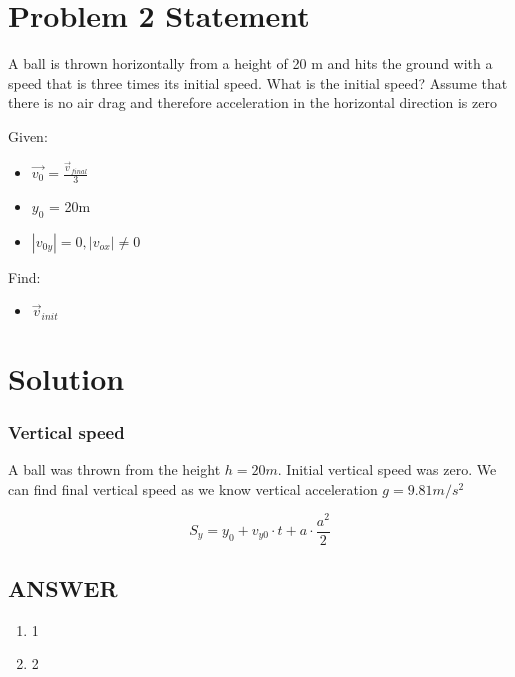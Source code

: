 \section*{Problem 2 Statement}

A ball is thrown horizontally from a height of 20 m and hits the ground with a speed that is three
times its initial speed. What is the initial speed? Assume that there is no air drag and therefore
acceleration in the horizontal direction is zero 

\bigbreak Given:
\begin{itemize}
    \item $\vec{v_0} = \frac{\vec{v}_{final}}{3}  $
    \item $y_0$ = 20m
    \item $|v_{0y}| = 0, |v_{ox}| \neq 0$
\end{itemize}

Find:
\begin{itemize}
    \item $\vec{v}_{init}$
\end{itemize}

\section*{Solution}
\subsubsection*{Vertical speed}

A ball was thrown from the height $h = 20m$. Initial vertical speed was zero.
We can find final vertical speed as we know vertical acceleration $g = 9.81m/s^2$

$$ S_y = y_0 + v_{y0} \cdot t + a \cdot \frac{a^2}{2}$$





\vfill
\subsection*{ANSWER}
\begin{enumerate}
    \item 1
    \item 2
\end{enumerate}
